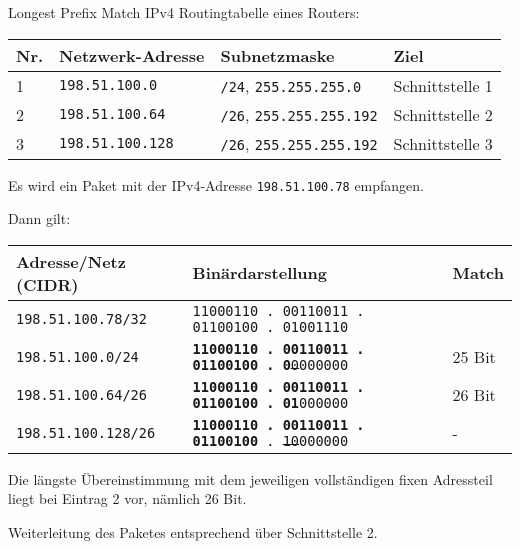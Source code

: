 \begin{example}{Longest Prefix Match}
    IPv4 Routingtabelle eines Routers:

    \begin{tabular}{|l|l|l|l|}
        \hline
        Nr. & Netzwerk-Adresse        & Subnetzmaske                           & Ziel            \\
        \hline \hline
        1   & \texttt{198.51.100.0}   & \texttt{/24}, \texttt{255.255.255.0}   & Schnittstelle 1 \\
        \hline
        2   & \texttt{198.51.100.64}  & \texttt{/26}, \texttt{255.255.255.192} & Schnittstelle 2 \\
        \hline
        3   & \texttt{198.51.100.128} & \texttt{/26}, \texttt{255.255.255.192} & Schnittstelle 3 \\
        \hline
    \end{tabular}

    Es wird ein Paket mit der IPv4-Adresse \texttt{198.51.100.78} empfangen.

    Dann gilt:

    \begin{tabular}{|l|l|l|}
        \hline
        Adresse/Netz (CIDR)        & Binärdarstellung                                                 & Match  \\
        \hline\hline
        \texttt{198.51.100.78/32}  & \texttt{11000110 . 00110011 . 01100100 . 01001110}               &        \\
        \hline\hline
        \texttt{198.51.100.0/24}   & \texttt{\textbf{11000110 . 00110011 . 01100100 . 0}\st{0}000000} & 25 Bit \\
        \hline
        \texttt{198.51.100.64/26}  & \texttt{\textbf{11000110 . 00110011 . 01100100 . 01}000000}      & 26 Bit \\
        \hline
        \texttt{198.51.100.128/26} & \texttt{\textbf{11000110 . 00110011 . 01100100} . \st{10}000000} & -      \\
        \hline
    \end{tabular}

    Die längste Übereinstimmung mit dem jeweiligen vollständigen fixen Adressteil liegt bei Eintrag 2 vor, nämlich 26 Bit.

    Weiterleitung des Paketes entsprechend über Schnittstelle 2.
\end{example}

